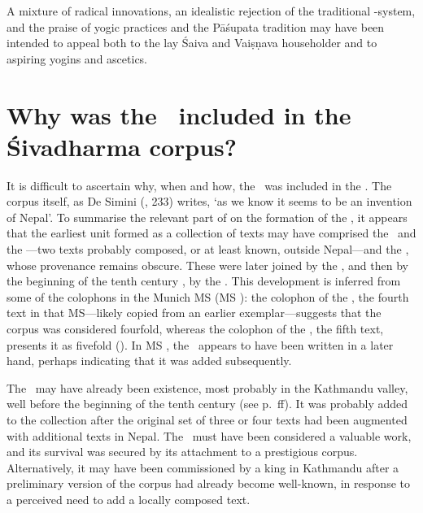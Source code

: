 A mixture of radical innovations, an idealistic rejection of the traditional -system, and the 
praise of yogic practices and the Pāśupata tradition may have been intended to
appeal both to the lay Śaiva and Vaiṣṇava householder and to aspiring yogins and ascetics.





\section{Why was the \VSS\ included in the Śivadharma corpus?}

It is difficult to ascertain why, when and how, the \VSS\ was included in the \Sivadharmacorpus.
The corpus itself, as De Simini  (\citeyear{DeSiminiMSSFromNepal2016}, 233) writes,
`as we know it seems to be an invention of Nepal'.
To summarise the relevant part of  on the formation 
of the \Sivadharmacorpus, it appears that the
earliest unit formed as a collection of texts may have comprised the \SDhS\ and
the \SDhU---two texts probably composed, or at least known, outside Nepal---and the
\SDhSangr, whose provenance remains obscure.
These were later joined by the \UMS, and then by the beginning of the tenth century \CE, 
by the \SivaUp.
This development is inferred from some of the colophons in the Munich MS (MS \msM):
the colophon of the \UMS, the fourth text in that MS---likely copied from an earlier exemplar---suggests
that the corpus was considered fourfold, whereas the colophon of the \SivaUp,
the fifth text, presents it as fivefold ().
In MS \msM, the \VSS\ appears to have been written in a later hand, perhaps
indicating that it was added subsequently.


The \VSS\ may have already been existence, most probably in the Kathmandu valley,
well before the beginning of the tenth century (see p.~\pageref{provenance}ff).
It was probably added to the collection after the original set of three or four
texts had been augmented with additional texts in Nepal. The \VSS\ must have been considered
a valuable work, and its survival was secured by its attachment to a 
prestigious corpus. Alternatively, it may have been commissioned by a king in Kathmandu
after a preliminary version of the corpus had already become well-known, 
in response to a perceived need to add a locally composed text.





